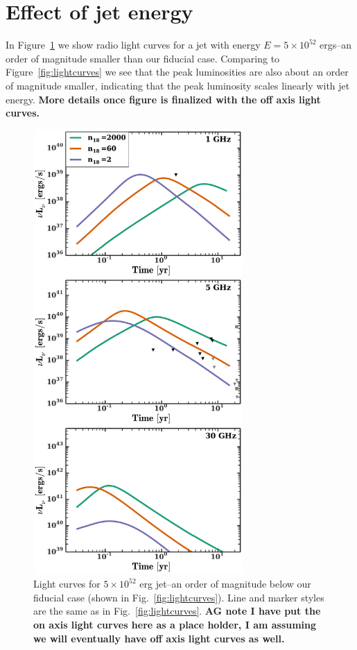 \documentclass[usenatbib,fleqn]{mnras}
\begin{document}
\section{Effect of jet energy}
In Figure~\ref{fig:lightcurves_lw} we show radio light curves
for a jet with energy $E=5\times 10^{52}$
ergs--an order of magnitude smaller than our fiducial case.
Comparing to Figure~\ref{fig:lightcurves} we see that the peak
luminosities are also about an order of magnitude smaller, indicating
that the peak luminosity scales linearly with jet energy. {\bf More
  details once figure is finalized with the off axis light curves.}

\begin{figure} 
  \includegraphics[width=8cm]{lightcurves_lw.pdf}
  \caption{\label{fig:lightcurves_lw} Light curves for $5\times
    10^{52}$ erg jet--an order of magnitude below our fiducial case
    (shown in Fig.~\ref{fig:lightcurves}). Line and marker styles are
    the same as in Fig.~\ref{fig:lightcurves}. {\bf AG note I have
      put the on axis light curves here as a place holder, I am
      assuming we will eventually have off axis light curves as well.}}
\end{figure}
\end{document}
